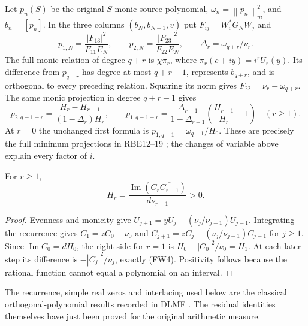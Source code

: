 \documentclass[11pt]{article}
\newcommand{\norm}[1]{\left\lVert#1\right\rVert}
\begin{document}
Let $p_n(S)$ be the original $S$-monic source polynomial,
$\omega_n=\norm{p_n}_m^2$, and $b_n=[p_n]$. In the three columns
$(b_N,b_{N+1},v)$ put $F_{ij}=W_i^*G_NW_j$ and
\[
 p_{1,N}=\frac{|F_{13}|^2}{F_{11}E_N},\qquad
 p_{2,N}=\frac{|F_{23}|^2}{F_{22}E_N},\qquad
 \Delta_r=\omega_{q+r}/\nu_r.
\]
The full monic relation of degree $q+r$ is $\chi\pi_r$, where
$\pi_r(c+iy)=i^rU_r(y)$. Its difference from $p_{q+r}$ has degree
at most $q+r-1$, represents $b_{q+r}$, and is orthogonal to every
preceding relation. Squaring its norm gives $F_{22}=\nu_r-\omega_{q+r}$.
The same monic projection in degree $q+r-1$ gives
\begin{equation}\tag{FW5}
 p_{2,q-1+r}=\frac{H_r-H_{r+1}}{(1-\Delta_r)H_r},\qquad
 p_{1,q-1+r}=\frac{\Delta_{r-1}}{1-\Delta_{r-1}}
                  \left(\frac{H_{r-1}}{H_r}-1\right)\quad(r\ge1).
\end{equation}
At $r=0$ the unchanged first formula is $p_{1,q-1}=\omega_{q-1}/H_0$.
These are precisely the full minimum projections in RBE12--19
\cite{rbe}; the changes of variable above explain every factor of $i$.

\begin{lemma}
For $r\ge1$,
\begin{equation}\tag{FW6}
 H_r=\frac{\operatorname{Im}(C_r\overline{C_{r-1}})}{d\nu_{r-1}}>0.
\end{equation}
\end{lemma}
\begin{proof}
Evenness and monicity give $U_{j+1}=yU_j-(\nu_j/\nu_{j-1})U_{j-1}$.
Integrating the recurrence gives $C_1=zC_0-\nu_0$ and
$C_{j+1}=zC_j-(\nu_j/\nu_{j-1})C_{j-1}$ for $j\ge1$.
Since $\operatorname{Im}C_0=dH_0$, the right side for $r=1$ is
$H_0-|C_0|^2/\nu_0=H_1$. At each later step its difference is
$-|C_j|^2/\nu_j$, exactly (FW4). Positivity follows because the
rational function cannot equal a polynomial on an interval.
\end{proof}
The recurrence, simple real zeros and interlacing used below are the
classical orthogonal-polynomial results recorded in DLMF
\cite[\S18.2(iv), (vi), (vii)]{DLMF}. The residual identities themselves
have just been proved for the original arithmetic measure.
\end{document}
